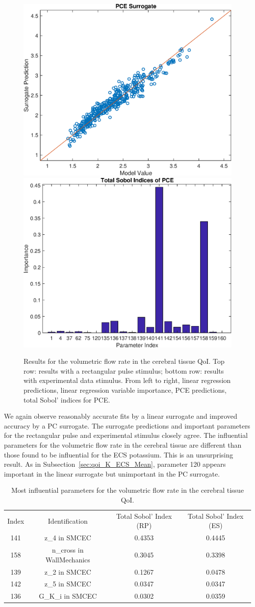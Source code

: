 \documentclass[12pt]{article}
\numberwithin{equation}{section}
\begin{document}
\begin{figure}[h]
\includegraphics[width=.24 \textwidth]{Figures/Vol_Flow_QoI_PCE_Prediction_Experimental.eps}
\includegraphics[width=.24 \textwidth]{Figures/Vol_Flow_QoI_PCE_SI_Experimental.eps}
\caption{Results for the volumetric flow rate in the cerebral tissue QoI. Top row: results with a rectangular pulse stimulus; bottom row: results with experimental data stimulus. From left to right, linear regression predictions, linear regression variable importance, PCE predictions, total Sobol' indices for PCE.}
\label{fig:qoi_vol_flow}
\end{figure}

We again observe reasonably accurate fits by a linear surrogate and improved accuracy by a PC surrogate. The surrogate predictions and important parameters for the rectangular pulse and experimental stimulus closely agree. The influential parameters for the volumetric flow rate in the cerebral tissue are different than those found to be influential for the ECS potassium. This is an unsurprising result. As in Subsection~\ref{sec:qoi_K_ECS_Mean}, parameter 120 appears important in the linear surrogate but unimportant in the PC surrogate.

\begin{table}[h]
\centering
\begin{tabular}{cccc}
Index & Identification & Total Sobol' Index (RP) & Total Sobol' Index (ES)\\
141 &  z\_4 in SMCEC &  0.4353 & 0.4445\\
158 & n\_cross in WallMechanics & 0.3045 & 0.3398\\
 139 & z\_2 in SMCEC & 0.1267 & 0.0478\\
 142 & z\_5 in SMCEC & 0.0347 & 0.0347\\
  136 & G\_K\_i in SMCEC & 0.0302 & 0.0359\\
\end{tabular}
\caption{Most influential parameters for the volumetric flow rate in the cerebral tissue QoI.}
\label{tab:qoi_vol_flow}
\end{table}
\end{document}
